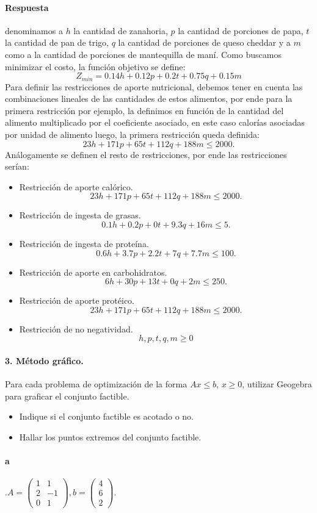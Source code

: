 \documentclass{article}
\begin{document}
	\paragraph{Respuesta} denominamos a $h$ la cantidad de zanahoria, $p$ la cantidad de porciones de papa, $t$ la cantidad de pan de trigo, $q$ la cantidad de porciones de queso cheddar y a $m$ como a la cantidad de porciones de mantequilla de maní. Como buscamos minimizar el costo, la función objetivo se define:
	$$Z_{min} = 0.14h + 0.12p + 0.2t + 0.75q + 0.15m$$
	Para definir las restricciones de aporte nutricional, debemos tener en cuenta las combinaciones lineales de las cantidades de estos alimentos, por ende para la primera restricción por ejemplo, la definimos en función de la cantidad del alimento multiplicado por el coeficiente asociado, en este caso calorías asociadas por unidad de alimento luego, la primera restricción queda definida:
	$$23h + 171p + 65t + 112q + 188m \leq 2000.$$
	Análogamente se definen el resto de restricciones, por ende las restricciones serían:
	\begin{itemize}
		\item Restricción de aporte calórico.
		$$23h + 171p + 65t + 112q + 188m \leq 2000.$$
		\item Restricción de ingesta de grasas.
		$$0.1h + 0.2p + 0t + 9.3q + 16m \leq 5.$$
		\item Restricción de ingesta de proteína.
		$$0.6h + 3.7p + 2.2t + 7q + 7.7m \leq 100.$$
		\item Restricción de aporte en carbohidratos.
		$$6h + 30p + 13t + 0q + 2m \leq 250.$$
		\item Restricción de aporte protéico.
		$$23h + 171p + 65t + 112q + 188m \leq 2000.$$
		\item Restricción de no negatividad.
		$$h,p,t,q,m \geq 0$$
	\end{itemize}
	\newpage
	\paragraph{3. Método gráfico.} Para cada problema de optimización de la forma $Ax \leq b$, $x \geq 0$, utilizar Geogebra para graficar el conjunto factible.
	\begin{itemize}
		\item Indique si el conjunto factible es acotado o no.
		\item Hallar los puntos extremos del conjunto factible.
	\end{itemize}
	\paragraph{a}.$
	A = \begin{pmatrix}
	1 & 1\\
	2 & -1\\
	0 & 1
	\end{pmatrix},
	b = \begin{pmatrix}
	4\\
	6\\
	2
	\end{pmatrix}
	$.
\end{document}
